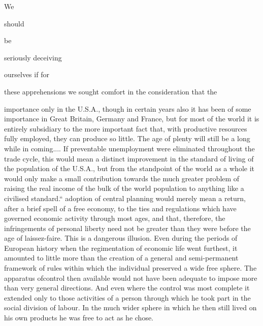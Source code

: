 \documentclass[11pt,openany]{book}
\begin{document}
\begin{center}\textasteriskcentered\hspace{0.9em}\textasteriskcentered\hspace{0.9em}\textasteriskcentered\end{center}

\begin{center}\textasteriskcentered\hspace{0.9em}\textasteriskcentered\hspace{0.9em}\textasteriskcentered\end{center}

We

should

be

seriously deceiving

ourselves if for

these apprehensions we sought comfort in the consideration that the

importance only in the U.S.A., though in certain years also it has been of some importance in Great Britain, Germany and France, but for most of the world it is entirely subsidiary to the more important fact that, with productive resources fully employed, they can produce so little. The age of plenty will still be a long while in coming.... If preventable unemployment were eliminated throughout the trade cycle, this would mean a distinct improvement in the standard of living of the population of the U.S.A., but from the standpoint of the world as a whole it would only make a small contribution towards the much greater problem of raising the real income of the bulk of the world population to anything like a civilised standard.`` adoption of central planning would merely mean a return, after a brief spell of a free economy, to the ties and regulations which have governed economic activity through most ages, and that, therefore, the infringements of personal liberty need not be greater than they were before the age of laissez-faire. This is a dangerous illusion. Even during the periods of European history when the regimentation of economic life went furthest, it amounted to little more than the creation of a general and semi-permanent framework of rules within which the individual preserved a wide free sphere. The apparatus ofcontrol then available would not have been adequate to impose more than very general directions. And even where the control was most complete it extended only to those activities of a person through which he took part in the social division of labour. In the much wider sphere in which he then still lived on his own products he was free to act as he chose.
\end{document}

